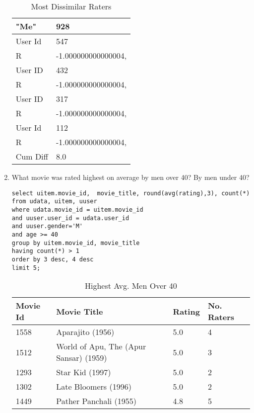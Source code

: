 \documentclass[letterpaper,11pt]{report}
\begin{document}
\begin{savenotes}
\begin{enumerate}
\begin{table}[htbp]
\centering
    \begin{tabular}{|l|l|}
    \hline
    "Me"     & 928                 \\ \hline
    User Id  & 547                 \\ \hline
    R        & -1.000000000000004, \\ \hline
    User ID  & 432                 \\ \hline
    R        & -1.000000000000004, \\ \hline
    User ID  & 317                 \\ \hline
    R        & -1.000000000000004, \\ \hline
    User Id  & 112                 \\ \hline
    R        & -1.000000000000004, \\ \hline
    Cum Diff & 8.0                 \\ \hline
    \end{tabular}
    \caption {Most Dissimilar Raters}
\end{table}

\item What movie was rated highest on average by men over 40? By men under 40?
\begin{verbatim}
select uitem.movie_id,  movie_title, round(avg(rating),3), count(*) 
from udata, uitem, uuser 
where udata.movie_id = uitem.movie_id 
and uuser.user_id = udata.user_id 
and uuser.gender='M' 
and age >= 40 
group by uitem.movie_id, movie_title 
having count(*) > 1 
order by 3 desc, 4 desc 
limit 5;
\end{verbatim}

\begin{table}[htbp]
\centering
    \begin{tabular}{|l|l|l|l|}
    \hline
    Movie Id & Movie Title                            & Rating & No. Raters \\ \hline
    1558     & Aparajito (1956)                       & 5.0    & 4          \\ \hline
    1512     & World of Apu, The (Apur Sansar) (1959) & 5.0    & 3          \\ \hline
    1293     & Star Kid (1997)                        & 5.0    & 2          \\ \hline
    1302     & Late Bloomers (1996)                   & 5.0    & 2          \\ \hline
    1449     & Pather Panchali (1955)                 & 4.8    & 5          \\ \hline
    \end{tabular}
    \caption {Highest Avg. Men Over 40}
\end{table}


\end{enumerate}
\end{savenotes}
\end{document}
